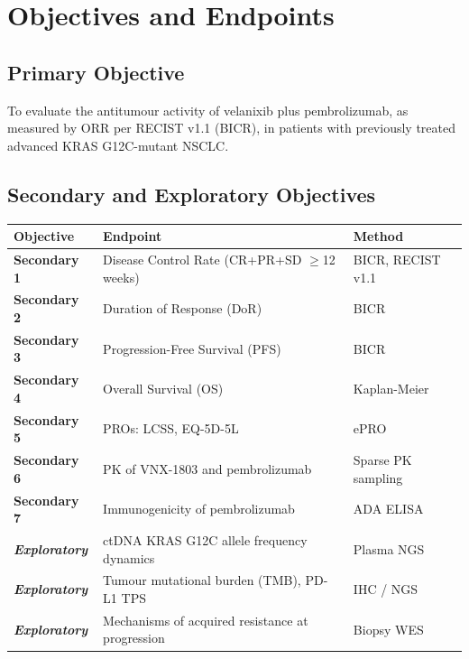 \section{Objectives and Endpoints}
\label{sec:objectives}

\subsection{Primary Objective}

To evaluate the antitumour activity of velanixib plus pembrolizumab, as measured by ORR per RECIST v1.1 (BICR), in patients with previously treated advanced KRAS G12C-mutant NSCLC.

\subsection{Secondary and Exploratory Objectives}

\renewcommand{\arraystretch}{1.4}
\begin{tabularx}{\linewidth}{@{}>{\bfseries\color{accent}}l@{\hspace{5mm}}>{\raggedright\arraybackslash}X@{\hspace{5mm}}>{\raggedright\arraybackslash}l@{}}
  \toprule
  \normalcolor\textbf{Objective} & \normalcolor\textbf{Endpoint} & \normalcolor\textbf{Method} \\
  \midrule
  Secondary 1 & Disease Control Rate (CR+PR+SD $\geq$12 weeks) & BICR, RECIST v1.1 \\
  Secondary 2 & Duration of Response (DoR) & BICR \\
  Secondary 3 & Progression-Free Survival (PFS) & BICR \\
  Secondary 4 & Overall Survival (OS) & Kaplan-Meier \\
  Secondary 5 & PROs: LCSS, EQ-5D-5L & ePRO \\
  Secondary 6 & PK of VNX-1803 and pembrolizumab & Sparse PK sampling \\
  Secondary 7 & Immunogenicity of pembrolizumab & ADA ELISA \\
  \midrule
  \itshape Exploratory & ctDNA KRAS G12C allele frequency dynamics & Plasma NGS \\
  \itshape Exploratory & Tumour mutational burden (TMB), PD-L1 TPS & IHC / NGS \\
  \itshape Exploratory & Mechanisms of acquired resistance at progression & Biopsy WES \\
  \bottomrule
\end{tabularx}
\renewcommand{\arraystretch}{1.35}

